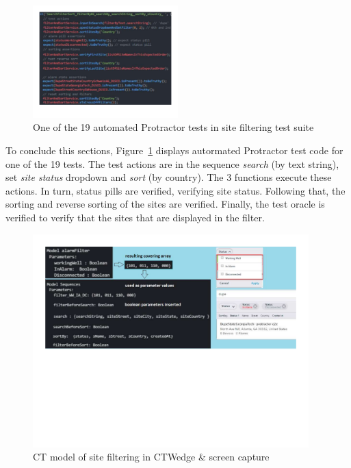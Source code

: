 \documentclass[conference]{IEEEtran}
\begin{document}
	\begin{figure}[!h]
		\includegraphics[width=0.50\textwidth,]{sortingTestCode.pdf}
		\caption{One of the 19 automated Protractor tests in site filtering test suite}
		\label{fig:sortingTestCode}
	\end{figure}

	To conclude this sections, Figure~\ref{fig:sortingTestCode} displays autormated Protractor test code for one of the 19 tests.
	The test actions are in the sequence \textit{search} (by text string), set \textit{site status} dropdown and \textit{sort} (by country). 
	The 3 functions execute these actions.
	In turn, status pills are verified, verifying site status.
	Following that, the sorting and reverse sorting of the sites are verified.
	Finally, the test oracle is verified to verify that the sites that are displayed in the filter.
		
	\begin{figure}[!hb]
		\centering
			\includegraphics[width=0.95\textwidth,]{siteFilterModel.pdf}
			\caption{CT model of site filtering in CTWedge \& screen capture}
			\label{fig:siteFilterModel}
	\end{figure}
\end{document}

